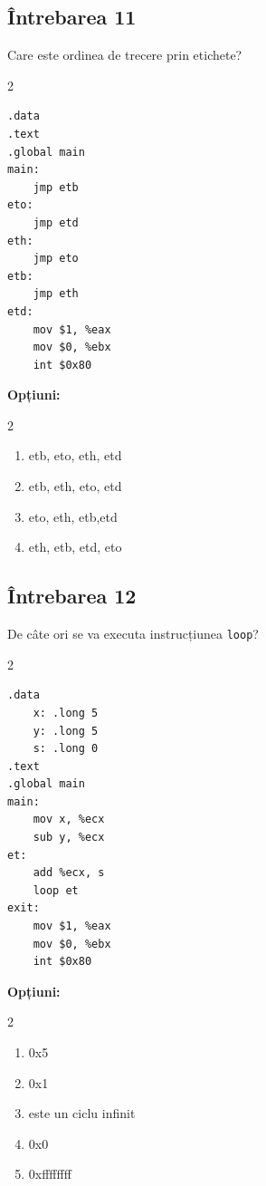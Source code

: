 \documentclass[12pt,a4paper]{article}
\begin{document}
\subsection*{Întrebarea 11}
Care este ordinea de trecere prin etichete?

\begin{multicols}{2}
\begin{lstlisting}[language=x86asm]
.data
.text
.global main
main:
    jmp etb
eto:
    jmp etd
eth:
    jmp eto
etb:
    jmp eth
etd:
    mov $1, %eax
    mov $0, %ebx
    int $0x80
\end{lstlisting}
\end{multicols}

\textbf{Opțiuni:}
\begin{multicols}{2}
\begin{enumerate}[label=\alph*)]
    \item etb, eto, eth, etd
    \item etb, eth, eto, etd 
    \item eto, eth, etb,etd
    \item eth, etb, etd, eto
\end{enumerate}
\end{multicols}

\subsection*{Întrebarea 12}
De câte ori se va executa instrucțiunea \texttt{loop}?
\begin{multicols}{2}
\begin{lstlisting}[language=x86asm]
.data
    x: .long 5
    y: .long 5
    s: .long 0
.text
.global main
main:
    mov x, %ecx
    sub y, %ecx
et:
    add %ecx, s
    loop et
exit:
    mov $1, %eax
    mov $0, %ebx
    int $0x80
\end{lstlisting}
\end{multicols}

\textbf{Opțiuni:}
\begin{multicols}{2}
\begin{enumerate}[label=\alph*)]
    \item 0x5
    \item 0x1
    \item este un ciclu infinit
    \item 0x0 
    \item 0xffffffff
\end{enumerate}
\end{multicols}
\end{document}
